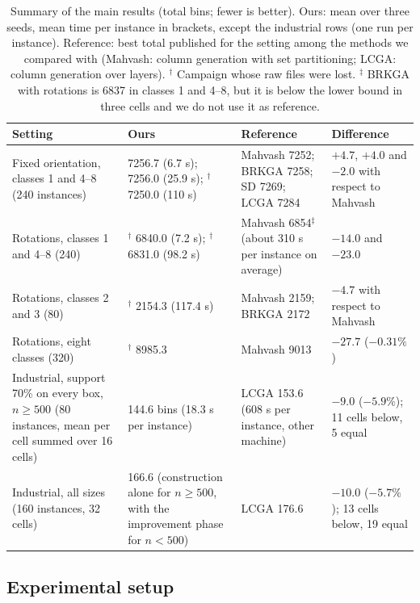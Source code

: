 \begin{table}[t]
\centering
\small\setlength{\tabcolsep}{4pt}
\caption{Summary of the main results (total bins; fewer is better). Ours: mean over three seeds, mean time per instance in brackets, except the industrial rows (one run per instance).
Reference: best total published for the setting among the methods we compared with (Mahvash: column generation with set partitioning; LCGA: column generation over layers).
$^\dagger$ Campaign whose raw files were lost. $^\ddagger$ BRKGA with rotations is 6837 in classes 1 and 4--8, but it is below the lower bound in three cells and we do not use it as reference.}
\label{tab:e-summary}
\begin{tabular}{@{}p{4.1cm}p{4.9cm}p{3.4cm}p{2.6cm}@{}}
\toprule
Setting & Ours & Reference & Difference\\
\midrule
Fixed orientation, classes 1 and 4--8 (240 instances) &
\cfgfast{} 7256.7 (6.7 s); \cfgbal{} 7256.0 (25.9 s); \cfgqual{}$^\dagger$ 7250.0 (110 s) &
Mahvash 7252; BRKGA 7258; SD 7269; LCGA 7284 &
$+4.7$, $+4.0$ and $-2.0$ with respect to Mahvash\\
\addlinespace
Rotations, classes 1 and 4--8 (240) &
\cfgfast{}$^\dagger$ 6840.0 (7.2 s); \cfgqual{}$^\dagger$ 6831.0 (98.2 s) &
Mahvash 6854$^\ddagger$ (about 310 s per instance on average) &
$-14.0$ and $-23.0$\\
\addlinespace
Rotations, classes 2 and 3 (80) &
\cfgqual{}$^\dagger$ 2154.3 (117.4 s) &
Mahvash 2159; BRKGA 2172 &
$-4.7$ with respect to Mahvash\\
\addlinespace
Rotations, eight classes (320) &
\cfgqual{}$^\dagger$ 8985.3 &
Mahvash 9013 &
$-27.7$ ($-0.31\%$)\\
\addlinespace
Industrial, support 70\% on every box, $n\ge 500$ (80 instances, mean per cell summed over 16 cells) &
144.6 bins (18.3 s per instance) &
LCGA 153.6 (608 s per instance, other machine) &
$-9.0$ ($-5.9\%$); 11 cells below, 5 equal\\
\addlinespace
Industrial, all sizes (160 instances, 32 cells) &
166.6 (construction alone for $n\ge 500$, with the improvement phase for $n<500$) &
LCGA 176.6 &
$-10.0$ ($-5.7\%$); 13 cells below, 19 equal\\
\bottomrule
\end{tabular}
\end{table}

\subsection{Experimental setup}
\label{sec:e-setup}


